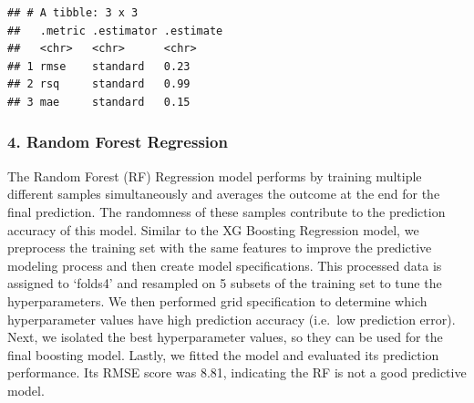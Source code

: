 \documentclass[
]{article}
\begin{document}
\begin{verbatim}
## # A tibble: 3 x 3
##   .metric .estimator .estimate
##   <chr>   <chr>      <chr>    
## 1 rmse    standard   0.23     
## 2 rsq     standard   0.99     
## 3 mae     standard   0.15
\end{verbatim}

\hypertarget{random-forest-regression}{%
\subsubsection{4. Random Forest
Regression}\label{random-forest-regression}}

The Random Forest (RF) Regression model performs by training multiple
different samples simultaneously and averages the outcome at the end for
the final prediction. The randomness of these samples contribute to the
prediction accuracy of this model. Similar to the XG Boosting Regression
model, we preprocess the training set with the same features to improve
the predictive modeling process and then create model specifications.
This processed data is assigned to `folds4' and resampled on 5 subsets
of the training set to tune the hyperparameters. We then performed grid
specification to determine which hyperparameter values have high
prediction accuracy (i.e.~low prediction error). Next, we isolated the
best hyperparameter values, so they can be used for the final boosting
model. Lastly, we fitted the model and evaluated its prediction
performance. Its RMSE score was 8.81, indicating the RF is not a good
predictive model.
\end{document}
